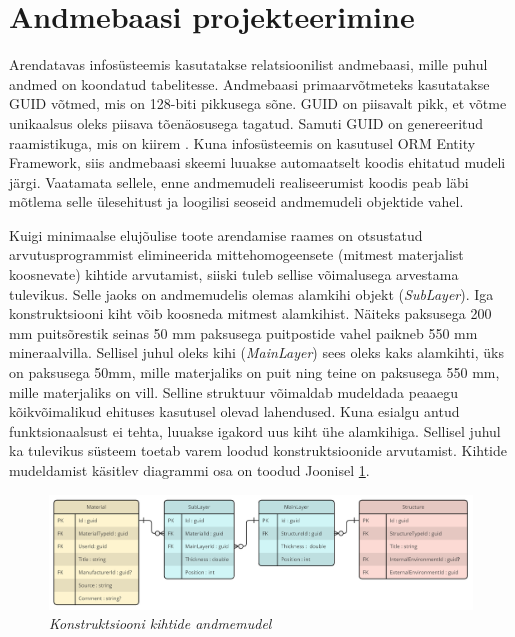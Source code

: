 \section{Andmebaasi projekteerimine}
\label{chapters:analysis_database}
Arendatavas infosüsteemis kasutatakse relatsioonilist andmebaasi, mille puhul andmed on koondatud
tabelitesse. 
Andmebaasi primaarvõtmeteks kasutatakse GUID võtmed, mis on 128-biti pikkusega sõne.
GUID on piisavalt pikk, et võtme unikaalsus oleks piisava tõenäosusega tagatud. Samuti GUID on genereeritud
raamistikuga, mis on kiirem \cite{guid_definition}. Kuna infosüsteemis on kasutusel ORM Entity Framework, 
siis andmebaasi skeemi luuakse automaatselt koodis ehitatud mudeli järgi. Vaatamata sellele, enne 
andmemudeli realiseerumist koodis peab läbi mõtlema selle ülesehitust ja loogilisi seoseid andmemudeli
objektide vahel.

Kuigi minimaalse elujõulise toote arendamise raames on otsustatud arvutusprogrammist elimineerida mittehomogeensete
(mitmest materjalist koosnevate) kihtide arvutamist, siiski tuleb sellise võimalusega arvestama tulevikus. Selle jaoks on andmemudelis 
olemas alamkihi objekt (\textit{SubLayer}). Iga konstruktsiooni kiht võib koosneda mitmest alamkihist.
Näiteks paksusega 200 mm puitsõrestik seinas 50 mm paksusega puitpostide vahel paikneb 550 mm mineraalvilla. 
Sellisel juhul oleks kihi (\textit{MainLayer}) sees oleks kaks alamkihti, üks on paksusega 50mm, mille materjaliks
on puit ning teine on paksusega 550 mm, mille materjaliks on vill. Selline struktuur võimaldab mudeldada
peaaegu kõikvõimalikud ehituses kasutusel olevad lahendused. Kuna esialgu antud funktsionaalsust
ei tehta, luuakse igakord uus kiht ühe alamkihiga. Sellisel juhul ka tulevikus süsteem toetab varem loodud
konstruktsioonide arvutamist. Kihtide mudeldamist käsitlev diagrammi osa on toodud Joonisel \ref{fig:db_layers_model}.

\begin{figure}[ht]
    \centering
    \includegraphics[width=1\textwidth]{figures/analysis/db_desing_1.png}
    \caption[Konstruktsiooni kihtide andmemudel]{\textit{Konstruktsiooni kihtide andmemudel}}
    \label{fig:db_layers_model}
\end{figure}

